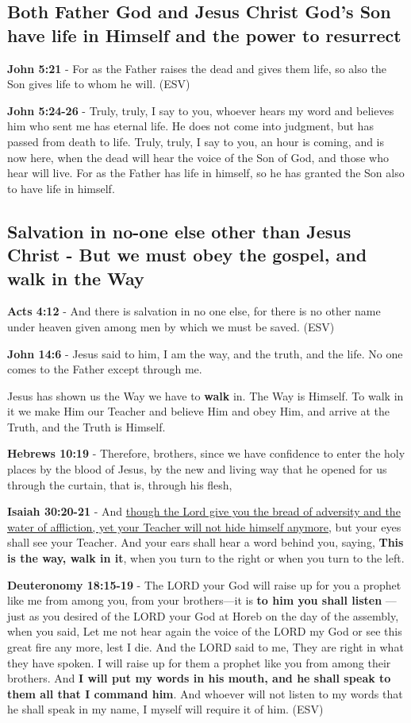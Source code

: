 \documentclass[11pt]{article}
\begin{document}
\subsection{Both Father God and Jesus Christ God's Son have life in Himself and the power to resurrect}
\label{sec:org17847ab}
\textbf{John 5:21} - For as the Father raises the dead and gives them life, so also the Son gives life to whom he will. (ESV)

\textbf{John 5:24-26} - Truly, truly, I say to you, whoever hears my word and believes him who sent me has eternal life. He does not come into judgment, but has passed from death to life. Truly, truly, I say to you, an hour is coming, and is now here, when the dead will hear the voice of the Son of God, and those who hear will live. For as the Father has life in himself, so he has granted the Son also to have life in himself.

\subsection{Salvation in no-one else other than Jesus Christ - But we must obey the gospel, and walk in the Way}
\label{sec:org33b4b8b}
\textbf{Acts 4:12} - And there is salvation in no one else, for there is no other name under heaven given among men by which we must be saved. (ESV)

\textbf{John 14:6} - Jesus said to him, I am the way, and the truth, and the life. No one comes to the Father except through me.

Jesus has shown us the Way we have to \textbf{walk} in. The Way is Himself. To walk in it we make Him our Teacher and believe Him and obey Him, and arrive at the Truth, and the Truth is Himself.

\textbf{Hebrews 10:19} - Therefore, brothers, since we have confidence to enter the holy places by the blood of Jesus, by the new and living way that he opened for us through the curtain, that is, through his flesh,

\textbf{Isaiah 30:20-21} - And \uline{though the Lord give you the bread of adversity and the water of affliction, yet your Teacher will not hide himself anymore}, but your eyes shall see your Teacher. And your ears shall hear a word behind you, saying, \textbf{This is the way, walk in it}, when you turn to the right or when you turn to the left.

\textbf{Deuteronomy 18:15-19} - The LORD your God will raise up for you a prophet like me from among you, from your brothers—it is \textbf{to him you shall listen} — just as you desired of the LORD your God at Horeb on the day of the assembly, when you said, Let me not hear again the voice of the LORD my God or see this great fire any more, lest I die. And the LORD said to me, They are right in what they have spoken. I will raise up for them a prophet like you from among their brothers. And \textbf{I will put my words in his mouth, and he shall speak to them all that I command him}. And whoever will not listen to my words that he shall speak in my name, I myself will require it of him. (ESV)
\end{document}
